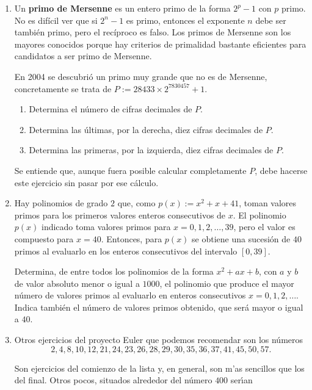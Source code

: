 \begin{enumerate}
\begin{enumerate}
\item  Un {\bf primo de Mersenne} es un entero primo de la forma $2^p-1$ con $p$ primo. No es difícil ver que si $2^n-1$ es primo, entonces el exponente $n$ debe ser también primo, pero el recíproco es falso. Los primos de Mersenne son los mayores conocidos porque hay criterios de primalidad bastante eficientes para candidatos a ser primo de Mersenne. 

En 2004 se descubrió un primo muy grande que no es de Mersenne, concretamente se trata de $P:=28433\times 2^{7830457}+1$. 
\begin{enumerate}
\item  Determina el número de cifras decimales de $P$.

\item Determina las últimas, por la derecha, diez cifras decimales de $P$.

\item Determina las primeras, por la izquierda, diez cifras decimales de $P$. 
\end{enumerate}
Se entiende que,  aunque fuera posible calcular completamente $P$, debe hacerse este ejercicio sin pasar por ese cálculo.

\item  Hay polinomios de grado $2$ que, como $p(x):=x^2+x+41$, toman valores primos para los primeros valores enteros consecutivos de $x$.  El polinomio $p(x)$ indicado toma valores primos para $x=0,1,2,\dots,39$, pero el valor es compuesto para $x=40$. Entonces, para $p(x)$ se obtiene una sucesión de $40$ primos al evaluarlo en los enteros consecutivos del intervalo $[0,39].$

Determina, de entre todos los polinomios de la forma $x^2+ax+b$, con $a$ y $b$ de valor absoluto menor o igual a $1000$, el polinomio que produce el mayor número de valores primos al evaluarlo en enteros consecutivos $x=0,1,2,\dots$. Indica también el número de valores primos obtenido, que será mayor o igual a $40$.  










\item Otros ejercicios del proyecto Euler que podemos recomendar son los n\'umeros \[2,4,8,10,12,21,24,23,26,28,29,30,35,36,37,41,45,50,57.\]

Son ejercicios del comienzo de la lista y, en general,  son m'as sencillos que los del final. Otros pocos, situados alrededor del n\'umero $400$ ser\'{\i}an


\end{enumerate}
\end{enumerate}
